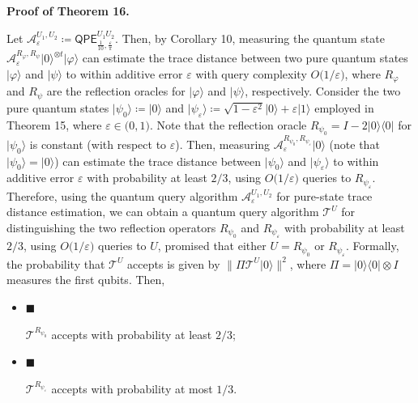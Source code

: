 \par\medskip\noindent\textbf{Proof of Theorem 16.}\par




Let $\mathcal{A}^{U_{1},U_{2}}_{\varepsilon}\coloneqq\mathsf{QPE}_{\frac{1}{10},\frac{\varepsilon}{\pi}}^{U_{1}U_{2}}$.
Then, by Corollary 10, measuring the quantum state $\mathcal{A}^{R_{\varphi},R_{\psi}}_{\varepsilon}\lvert 0\rangle^{\otimes t}\lvert\varphi\rangle$ can estimate the trace distance between two pure quantum states $\lvert\varphi\rangle$ and $\lvert\psi\rangle$ to within additive error $\varepsilon$ with query complexity $O\lparen 1/\varepsilon\rparen$, where $R_{\varphi}$ and $R_{\psi}$ are the reflection oracles for $\lvert\varphi\rangle$ and $\lvert\psi\rangle$, respectively.
Consider the two pure quantum states $\lvert\psi_{0}\rangle\coloneqq\lvert 0\rangle$ and $\lvert\psi_{\varepsilon}\rangle\coloneqq\sqrt{1-\varepsilon^{2}}\lvert 0\rangle+\varepsilon\lvert 1\rangle$ employed in Theorem 15, where $\varepsilon\in\lparen 0,1\rparen$.
Note that the reflection oracle $R_{\psi_{0}}=I-2\lvert 0\rangle\!\langle 0\rvert$ for $\lvert\psi_{0}\rangle$ is constant (with respect to $\varepsilon$).
Then, measuring $\mathcal{A}^{R_{\psi_{0}},R_{\psi_{\varepsilon}}}_{\varepsilon}\lvert 0\rangle$ (note that $\lvert\psi_{0}\rangle=\lvert 0\rangle$) can estimate the trace distance between $\lvert\psi_{0}\rangle$ and $\lvert\psi_{\varepsilon}\rangle$ to within additive error $\varepsilon$ with probability at least $2/3$, using $O\lparen 1/\varepsilon\rparen$ queries to $R_{\psi_{\varepsilon}}$.
Therefore, using the quantum query algorithm $\mathcal{A}^{U_{1},U_{2}}_{\varepsilon}$ for pure-state trace distance estimation, we can obtain a quantum query algorithm $\mathcal{T}^{U}$ for distinguishing the two reflection operators $R_{\psi_{0}}$ and $R_{\psi_{\varepsilon}}$ with probability at least $2/3$, using $O\lparen 1/\varepsilon\rparen$ queries to $U$, promised that either $U=R_{\psi_{0}}$ or $R_{\psi_{\varepsilon}}$.
Formally, the probability that $\mathcal{T}^{U}$ accepts is given by $\lVert\Pi\mathcal{T}^{U}\lvert 0\rangle\rVert^{2}$, where $\Pi=\lvert 0\rangle\!\langle 0\rvert\otimes I$ measures the first qubits.
Then,\par


\begin{itemize}


\item[] 
$\blacksquare$ 


$\mathcal{T}^{R_{\psi_{0}}}$ accepts with probability at least $2/3$;\par





\item[] 
$\blacksquare$ 


$\mathcal{T}^{R_{\psi_{\varepsilon}}}$ accepts with probability at most $1/3$.\par





\end{itemize}




